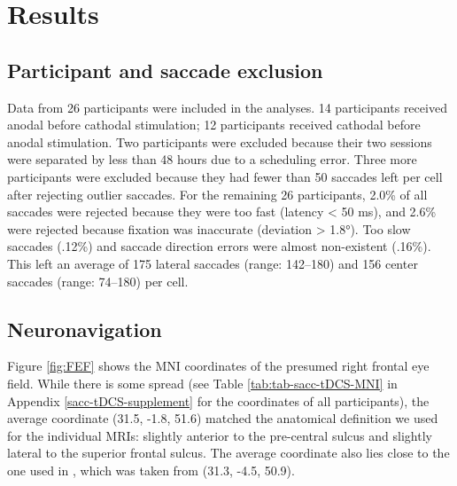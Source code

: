 \documentclass[11pt,]{memoir}
\begin{document}
\hypertarget{sacc_tDCS-results}{%
\section{Results}\label{sacc_tDCS-results}}

\hypertarget{participant-and-saccade-exclusion}{%
\subsection{Participant and saccade exclusion}\label{participant-and-saccade-exclusion}}

Data from 26 participants were included in the analyses. 14 participants received anodal before cathodal stimulation; 12 participants received cathodal before anodal stimulation. Two participants were excluded because their two sessions were separated by less than 48 hours due to a scheduling error. Three more participants were excluded because they had fewer than 50 saccades left per cell after rejecting outlier saccades. For the remaining 26 participants, 2.0\% of all saccades were rejected because they were too fast (latency \textless{} 50 ms), and 2.6\% were rejected because fixation was inaccurate (deviation \textgreater{} 1.8°). Too slow saccades (.12\%) and saccade direction errors were almost non-existent (.16\%). This left an average of 175 lateral saccades (range: 142--180) and 156 center saccades (range: 74--180) per cell.

\hypertarget{neuronavigation}{%
\subsection{Neuronavigation}\label{neuronavigation}}

Figure \ref{fig:FEF} shows the MNI coordinates of the presumed right frontal eye field. While there is some spread (see Table \ref{tab:tab-sacc-tDCS-MNI} in Appendix \ref{sacc-tDCS-supplement} for the coordinates of all participants), the average coordinate (31.5, -1.8, 51.6) matched the anatomical definition we used for the individual MRIs: slightly anterior to the pre-central sulcus and slightly lateral to the superior frontal sulcus. The average coordinate also lies close to the one used in \textcite{Kanai2012}, which was taken from \textcite{Paus1996} (31.3, -4.5, 50.9).
\end{document}
